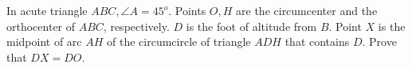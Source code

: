 In acute triangle $ABC, \angle A = 45^o$. Points $O,H$ are the circumcenter and the orthocenter of $ABC$,  respectively. $D$ is the foot of altitude from $B$. Point $X$ is the midpoint of arc $AH$ of the circumcircle of triangle $ADH$ that contains $D$. Prove that $DX = DO$.